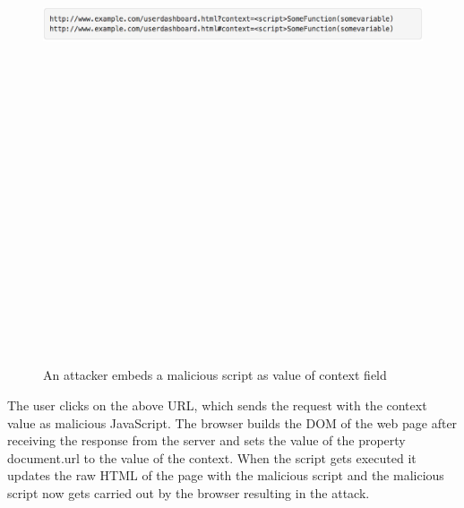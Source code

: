 \begin{figure}[htb]
\centering
\includegraphics[width=16cm,height=20cm,keepaspectratio]{image/dxss3.png}
\caption[DOM based cross-site scripting attack example]{An attacker embeds a malicious script as value of context field ~\cite{g20}} 
\label{fig:dxss3}
\end{figure}

The user clicks on the above URL, which sends the request with the context value as malicious JavaScript. The browser builds the DOM of the web page after receiving the response from the server and sets the value of the property document.url to the value of the context. When the script gets executed it updates the raw HTML of the page with the malicious script and the malicious script now gets carried out by the browser resulting in the attack.


